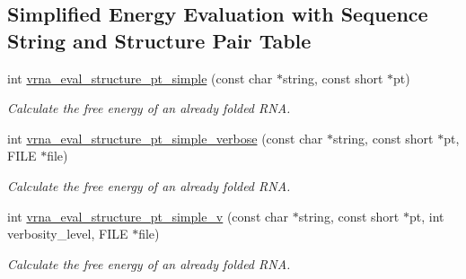 \subsection*{Simplified Energy Evaluation with Sequence String and Structure Pair Table}
\begin{DoxyCompactItemize}
\item 
int \mbox{\hyperlink{group__eval_ga0bba59b4d6e53461088666ff4aece7b0}{vrna\+\_\+eval\+\_\+structure\+\_\+pt\+\_\+simple}} (const char $\ast$string, const short $\ast$pt)
\begin{DoxyCompactList}\small\item\em Calculate the free energy of an already folded R\+NA. \end{DoxyCompactList}\item 
int \mbox{\hyperlink{group__eval_ga76e152ee9a02be23da14cdddf52b4e44}{vrna\+\_\+eval\+\_\+structure\+\_\+pt\+\_\+simple\+\_\+verbose}} (const char $\ast$string, const short $\ast$pt, F\+I\+LE $\ast$file)
\begin{DoxyCompactList}\small\item\em Calculate the free energy of an already folded R\+NA. \end{DoxyCompactList}\item 
int \mbox{\hyperlink{group__eval_gac40b813d35289da9816d0c1eec94faa5}{vrna\+\_\+eval\+\_\+structure\+\_\+pt\+\_\+simple\+\_\+v}} (const char $\ast$string, const short $\ast$pt, int verbosity\+\_\+level, F\+I\+LE $\ast$file)
\begin{DoxyCompactList}\small\item\em Calculate the free energy of an already folded R\+NA. \end{DoxyCompactList}\end{DoxyCompactItemize}
